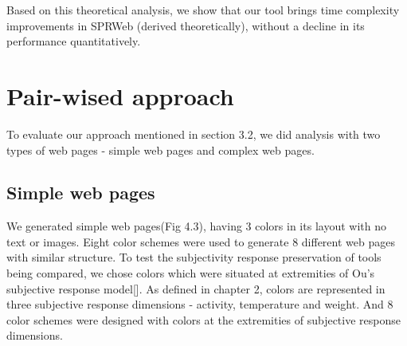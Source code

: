 Based on this theoretical analysis, we show that our tool brings time complexity improvements in SPRWeb (derived theoretically), without a decline in its performance quantitatively.  


\section{Pair-wised approach}
\label{Pair-wised apporach}

To evaluate our approach mentioned in section 3.2, we did analysis with two types of web pages - simple web pages and complex web pages. 

\subsection{Simple web pages}
\label{Simple web pages}

We generated simple web pages(Fig 4.3), having 3 colors in its layout with no text or images. Eight color schemes were used to generate 8 different web pages with similar structure. To test the subjectivity response preservation of tools being compared, we chose colors which were situated at extremities of Ou's subjective response model[]. As defined in chapter 2, colors are represented in three subjective response dimensions - activity, temperature and weight. And 8 color schemes were designed with colors at the extremities of subjective response dimensions. 

